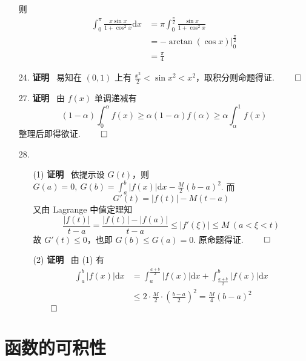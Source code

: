 \documentclass[11pt,oneside,fontset=fandol]{ctexbook} %
\renewcommand\theenumi{\thesection.\arabic{enumi}}
\begin{document}
\begin{enumerate}[label=\theenumi]
    则
    \begin{align*}
        \int_0^{\pi} \frac{x \sin x}{1 + \cos^2 x} \mathrm dx &= \pi \int_0^{\frac \pi 2} \frac{\sin x}{1 + \cos^2 x} \\
        &= -\arctan(\cos x) \bigg|_0^{\frac \pi 2} \\
        &= \frac \pi 4
    \end{align*}
    \item[24.]
    \textbf{证明} \ 易知在 $(0, 1)$ 上有 $\frac {x^2} 2 < \sin x^2 < x^2$，取积分则命题得证.
    $\hfill\qed$
    \item[27.]
    \textbf{证明} \ 由 $f(x)$ 单调递减有
    \[
        (1 - \alpha) \int_0^\alpha f(x) \geqslant \alpha (1 - \alpha) f(\alpha) \geqslant \alpha \int_\alpha^1 f(x)
    \]
    整理后即得欲证.
    $\hfill\qed$
    \item[28.]\label{item:28}
    \begin{enumerate}
        \item[(1)]
        \textbf{证明} \ 依提示设 $G(t)$，则 $G(a) = 0,\ G(b) = \int_a^b |f(x)| \mathrm dx - \frac M 2 (b-a)^2$. 而
        \[
            G'(t) = |f(t)| - M(t - a)
        \]
        又由 Lagrange 中值定理知
        \[
            \frac{|f(t)|}{t - a} = \frac{|f(t)| - |f(a)|}{t - a} \leqslant |f'(\xi)| \leqslant M \ (a < \xi < t)
        \]
        故 $G'(t) \leqslant 0$，也即 $G(b) \leqslant G(a) = 0$. 原命题得证.
        $\hfill\qed$
        \item[(2)]
        \textbf{证明} \ 由 (1) 有
        \begin{align*}
            \int_a^b |f(x)| \mathrm dx &= \int_a^{\frac {a+b} 2} |f(x)| \mathrm dx + \int_{\frac {a+b} 2}^b |f(x)| \mathrm dx \\
            &\leqslant 2 \cdot \frac M 2 \cdot (\frac {b-a} 2)^2 = \frac M 4 (b-a)^2
        \end{align*}
        $\hfill\qed$
    \end{enumerate}
\end{enumerate}

\section{函数的可积性}
\end{document}
